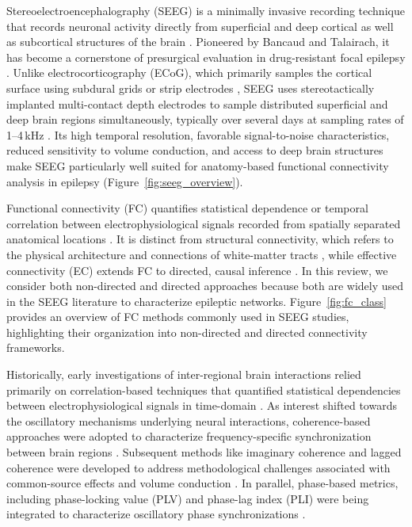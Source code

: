 \documentclass[12pt]{article}
\begin{document}
Stereoelectroencephalography (SEEG) is a minimally invasive recording technique that records neuronal activity directly from superficial and deep cortical as well as subcortical structures of the brain \cite{Serletis2014-em,Kondylis2025-xp,bulacio2016stereoelectroencephalography, mullin2016seeg}. Pioneered by Bancaud and Talairach, it has become a cornerstone of presurgical evaluation in drug-resistant focal epilepsy \cite{Bancaud1965, Talairach1966, gonzalez2013stereoelectroencephalography}. Unlike electrocorticography (ECoG), which primarily samples the cortical surface using subdural grids or strip electrodes \cite{Kuruvilla2003-us}, SEEG uses stereotactically implanted multi-contact depth electrodes to sample distributed superficial and deep brain regions simultaneously, typically over several days at sampling rates of 1--4\,kHz \cite{mullin2016seeg}. Its high temporal resolution, favorable signal-to-noise characteristics, reduced sensitivity to volume conduction, and access to deep brain structures make SEEG particularly well suited for anatomy-based functional connectivity analysis in epilepsy \cite{bartolomei2017defining, lagarde2018interictal} (Figure~\ref{fig:seeg_overview}).

Functional connectivity (FC) quantifies statistical dependence or temporal correlation between electrophysiological signals recorded from spatially separated anatomical locations \cite{friston1994functional,bastos2016tutorial}. It is distinct from structural connectivity, which refers to the physical architecture and connections of white-matter tracts \cite{yeh2021mapping}, while effective connectivity (EC) extends FC to directed, causal inference \cite{friston2011functional}. In this review, we consider both non-directed and directed approaches because both are widely used in the SEEG literature to characterize epileptic networks. Figure~\ref{fig:fc_class} provides an overview of FC methods commonly used in SEEG studies, highlighting their organization into non-directed and directed connectivity frameworks.  

Historically, early investigations of inter-regional brain interactions relied primarily on correlation-based techniques that quantified statistical dependencies between electrophysiological signals in time-domain \cite{Brazier1952-fd}. As interest shifted towards the oscillatory mechanisms underlying neural interactions, coherence-based approaches were adopted to characterize frequency-specific synchronization between brain regions \cite{Brazier1972-xt,Bartolomei1999-xa}. Subsequent methods like imaginary coherence and lagged coherence were developed to address methodological challenges associated with common-source effects and volume conduction \cite{Goodale2020-lj,Nolte2004-rx,Pascual-Marqui2007-zi}. In parallel, phase-based metrics, including phase-locking value (PLV) and phase-lag index (PLI) were being integrated to characterize oscillatory phase synchronizations \cite{lachaux1999measuring,Vinck2011-tv}.
\end{document}
